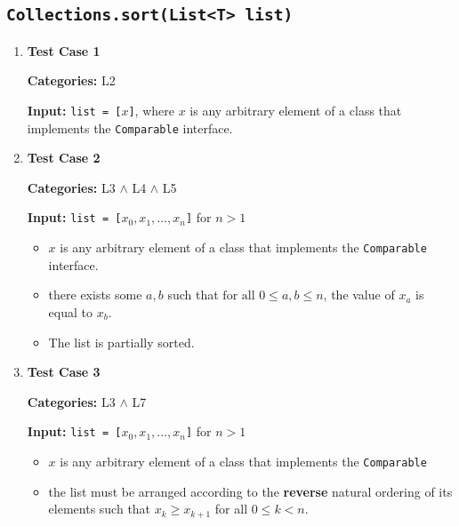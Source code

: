 \documentclass[12pt, a4paper]{article}
\begin{document}
\subsection{\texttt{Collections.sort(List<T> list)}}
\begin{enumerate}
  \item \textbf{Test Case 1}
  \par\quad\textbf{Categories:} L2

  \par\quad\textbf{Input:} \texttt{list = [$x$]}, where $x$ is any arbitrary element of a class
  that implements the \texttt{Comparable} interface.

  \item \textbf{Test Case 2}
  \par\quad\textbf{Categories:} L3 $\wedge$ L4 $\wedge$ L5

  \par\quad\textbf{Input:} \texttt{list = [$x_0, x_1, \dots, x_n$]} for $n > 1$
  \begin{itemize}
    \item $x$ is any arbitrary element of a class that implements the \texttt{Comparable}
    interface.
    \item there exists some $a, b$ such that $\text{for all } 0 \leq a,b \leq n$, the value of $x_a$
    is equal to $x_b$.
    \item The list is partially sorted.
  \end{itemize}

  \item \textbf{Test Case 3}
  \par\quad\textbf{Categories:} L3 $\wedge$ L7
  \par\quad\textbf{Input:} \texttt{list = [$x_0, x_1, \dots, x_n$]} for $n > 1$
  \begin{itemize}
    \item $x$ is any arbitrary element of a class that implements the \texttt{Comparable}
    \item the list must be arranged according to the \textbf{reverse} natural ordering
    \cite{java_natural_order} of its elements such that $x_k \geq x_{k+1}$ for all $0 \leq k < n$.
  \end{itemize}
\end{enumerate}
\end{document}
